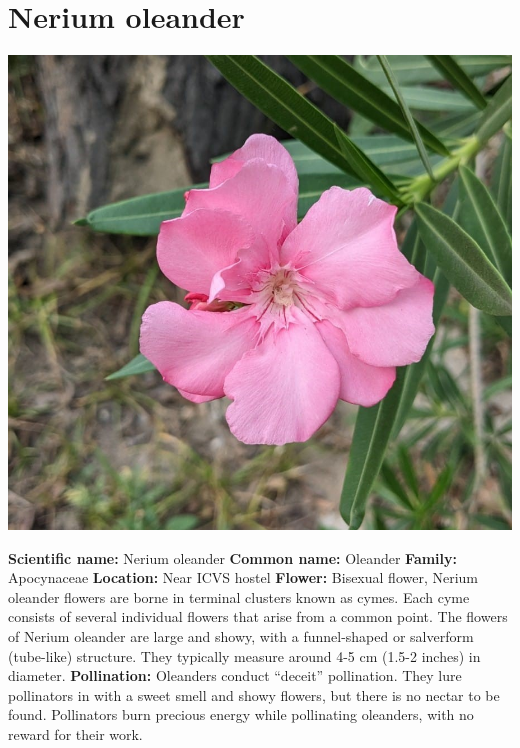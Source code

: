 \documentclass{article}
\begin{document}
\section{Nerium oleander}
\begin{center}
    \includegraphics[scale=0.3]{images/WhatsApp Image 2023-06-19 at 13.52.19.jpg}
\end{center}
\textbf{Scientific name:} Nerium oleander\newline
\textbf{Common name:} Oleander\newline
\textbf{Family:} Apocynaceae\newline
\textbf{Location:} Near ICVS hostel\newline
\textbf{Flower:} Bisexual flower, Nerium oleander flowers are borne in terminal clusters known as cymes. Each cyme consists of several individual flowers that arise from a common point. The flowers of Nerium oleander are large and showy, with a funnel-shaped or salverform (tube-like) structure. They typically measure around 4-5 cm (1.5-2 inches) in diameter.  \newline
\textbf{Pollination:} Oleanders conduct \enquote{deceit} pollination. They lure pollinators in with a sweet smell and showy flowers, but there is no nectar to be found. Pollinators burn precious energy while pollinating oleanders, with no reward for their work.
\end{document}
